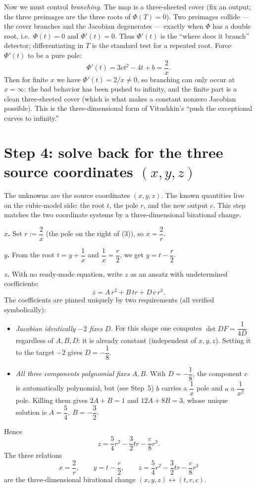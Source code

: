 \documentclass[11pt]{article}
\theoremstyle{plain}
\theoremstyle{definition}
\newcommand{\Jac}{\det DF}
\begin{document}
Now we must control \emph{branching}. The map is a three-sheeted cover (fix
an output; the three preimages are the three roots of $\Phi(T)=0$). Two
preimages collide --- the cover branches and the Jacobian degenerates ---
exactly when $\Phi$ has a double root, i.e.\ $\Phi(t)=0$ and $\Phi'(t)=0$.
Thus $\Phi'(t)$ is the ``where does it branch'' detector; differentiating in
$T$ is the standard test for a repeated root. Force $\Phi'(t)$ to be a pure
pole:
\begin{equation}
  \Phi'(t) = 3ct^2 - 4t + b = \frac{2}{x}. \label{eq:pole}
\end{equation}
Then for finite $x$ we have $\Phi'(t)=2/x\neq 0$, so branching can only occur
at $x=\infty$: the bad behavior has been pushed to infinity, and the finite
part is a clean three-sheeted cover (which is what makes a constant nonzero
Jacobian possible). This is the three-dimensional form of Vitushkin's
``push the exceptional curves to infinity.''

\section*{Step 4: solve back for the three source coordinates $(x,y,z)$}
The unknowns are the source coordinates $(x,y,z)$. The known quantities live
on the cubic-model side: the root $t$, the pole $r$, and the new output $c$.
This step matches the two coordinate systems by a three-dimensional
birational change.

\medskip\noindent\textbf{$x$.} Set $r:=\dfrac2x$ (the pole on the right of
(3)), so $x=\dfrac2r$.

\medskip\noindent\textbf{$y$.} From the root $t=y+\dfrac1x$ and
$\dfrac1x=\dfrac r2$, we get $y=t-\dfrac r2$.

\medskip\noindent\textbf{$z$.} With no ready-made equation, write $z$ as an
ansatz with undetermined coefficients:
\[
  z = A\,r^2 + B\,tr + D\,c\,r^3 .
\]
The coefficients are pinned uniquely by two requirements (all verified
symbolically):
\begin{itemize}[nosep]
  \item \emph{Jacobian identically $-2$ fixes $D$.} For this shape one
        computes $\Jac=\dfrac{1}{4D}$ regardless of $A,B,D$: it is already
        constant (independent of $x,y,z$). Setting it to the target $-2$
        gives $D=-\dfrac18$.
  \item \emph{All three components polynomial fixes $A,B$.} With
        $D=-\dfrac18$, the component $c$ is automatically polynomial, but (see
        Step~5) $b$ carries a $\dfrac1x$ pole and $a$ a $\dfrac1{x^2}$ pole.
        Killing them gives $2A+B=1$ and $12A+8B=3$, whose unique solution is
        $A=\dfrac54,\ B=-\dfrac32$.
\end{itemize}
Hence
\[
  z=\frac54r^2-\frac32tr-\frac{c}{8}r^3 .
\]
The three relations
\[
  x=\frac2r,\qquad y=t-\frac r2,\qquad
  z=\frac54r^2-\frac32tr-\frac{c}{8}r^3
\]
are the three-dimensional birational change $(x,y,z)\leftrightarrow(t,r,c)$.
\end{document}
